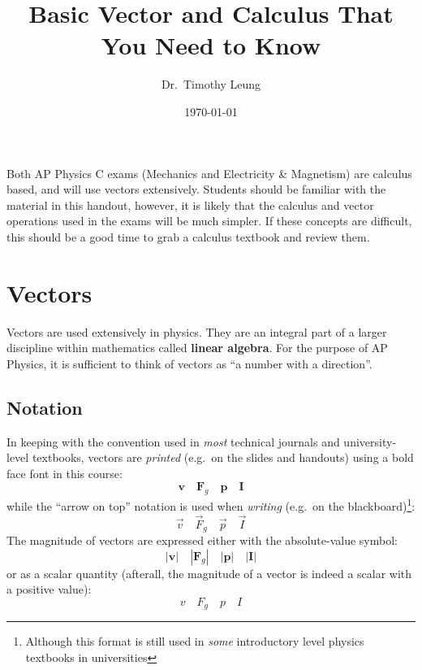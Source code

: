 \documentclass{../../../oss-handout}
\title{Basic Vector and Calculus That You Need to Know}
\author{Dr.\ Timothy Leung}
\date{\today}
\begin{document}
\thispagestyle{title}
\gentitle


Both AP Physics C exams (Mechanics and Electricity \& Magnetism) are calculus
based, and will use vectors extensively.
Students should be familiar with the material in this handout, however, it is
likely that the calculus and vector operations used in the exams will be much
simpler. If these concepts are difficult, this should be a good time to grab a
calculus textbook and review them.

\section{Vectors}
Vectors are used extensively in physics. They are an integral part of a larger
discipline within mathematics called \textbf{linear algebra}. For the purpose
of AP Physics, it is sufficient to think of vectors as
``a number with a direction''.

\subsection{Notation}
In keeping with the convention used in \emph{most} technical journals and
university-level textbooks, vectors are \emph{printed} (e.g.\ on the slides and
handouts) using a bold face font in this course:
\begin{equation*}
  \bm{v}\quad\bm{F}_g\quad\bm{p}\quad\bm{I}
\end{equation*}
while the ``arrow on top'' notation is used when \emph{writing} (e.g.\ on the
blackboard)\footnote{Although this format is still used in \emph{some}
  introductory level physics textbooks in universities}:
\begin{equation*}
  \vec{v}\quad\vec{F}_g\quad\vec{p}\quad\vec{I}
\end{equation*}
The magnitude of vectors are expressed either with the absolute-value symbol:
\begin{equation*}
  |\bm{v}|\quad|\bm{F}_g|\quad|\bm{p}|\quad|\bm{I}|
\end{equation*}
or as a scalar quantity (afterall, the magnitude of a vector is indeed a scalar
with a positive value):
\begin{equation*}
  v\quad F_g\quad p \quad I
\end{equation*}
\end{document}
